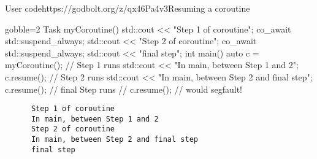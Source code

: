 \begin{frame}[fragile]
  \scriptsize
  \begin{exampleblockGB}{User code}{https://godbolt.org/z/qx46Pa4v3}{Resuming a coroutine}
    \begin{cppcode*}{gobble=2}
      Task myCoroutine() {
        std::cout << "Step 1 of coroutine\n";
        co_await std::suspend_always{};
        std::cout << "Step 2 of coroutine\n";
        co_await std::suspend_always{};
        std::cout << "final step\n";
      }
      int main() {
        auto c = myCoroutine(); // Step 1 runs
        std::cout << "In main, between Step 1 and 2\n";
        c.resume();             // Step 2 runs
        std::cout << "In main, between Step 2 and final step\n";
        c.resume();             // final Step runs
        // c.resume(); // would segfault!
      }
    \end{cppcode*}
  \end{exampleblockGB}
  \begin{block}{}
    \begin{verbatim}
      Step 1 of coroutine
      In main, between Step 1 and 2
      Step 2 of coroutine
      In main, between Step 2 and final step
      final step
    \end{verbatim}
  \end{block}
\end{frame}

